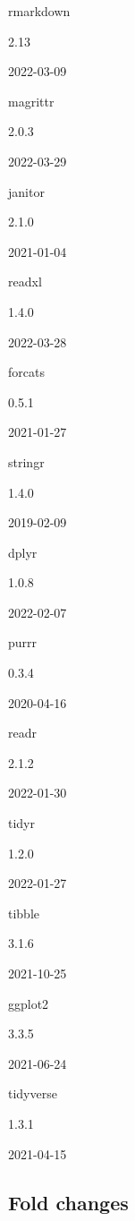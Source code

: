 \documentclass[9pt,lineno]{elife}
\begin{document}
rmarkdown

2.13

2022-03-09

magrittr

2.0.3

2022-03-29

janitor

2.1.0

2021-01-04

readxl

1.4.0

2022-03-28

forcats

0.5.1

2021-01-27

stringr

1.4.0

2019-02-09

dplyr

1.0.8

2022-02-07

purrr

0.3.4

2020-04-16

readr

2.1.2

2022-01-30

tidyr

1.2.0

2022-01-27

tibble

3.1.6

2021-10-25

ggplot2

3.3.5

2021-06-24

tidyverse

1.3.1

2021-04-15

\clearpage

\hypertarget{sup-foldchanges}{%
\subsection{Fold changes}\label{sup-foldchanges}}
\end{document}
